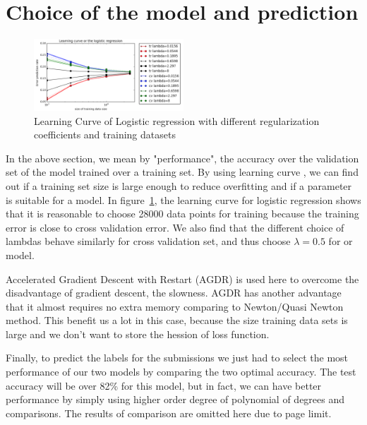 \documentclass[a4paper, 10pt]{article}
\begin{document}
	\section{Choice of the model and prediction}

			
					\begin{figure}[!ht]
						\centering
						\includegraphics[width=0.5\textwidth]{fig}
						\caption{Learning Curve of Logistic regression with different regularization coefficients and training datasets}
						\label{fig:1}
					\end{figure}	

		In the above section, we mean by "performance", the accuracy over the validation set of the model trained over a training set. By using learning curve , we can find out if a training set size 
		is large enough to reduce overfitting and if a parameter is suitable for a model. In figure~\ref{fig:1}, the learning curve for logistic regression shows that it is reasonable to choose 28000 data points for training because the training error is close to cross validation error. We also find that the different choice of lambdas behave similarly for cross validation set, and thus choose $\lambda=0.5$ for or model. 
		
		Accelerated Gradient Descent with Restart (AGDR) is used here to overcome the disadvantage of gradient descent, the slowness. AGDR has another advantage that it almost requires no extra memory comparing to Newton/Quasi Newton method. This benefit us a lot in this case,  because the size training data sets is large and  we don't want to store the hession of loss function.
				
		Finally, to predict the labels for the submissions we just had to select the most performance of our two models by comparing the two optimal accuracy. The test accuracy will be over 82\% for this model, but in fact, we can have better performance by simply using higher order degree of polynomial of degrees and comparisons. The results of comparison are omitted here due to page limit.
\end{document}
